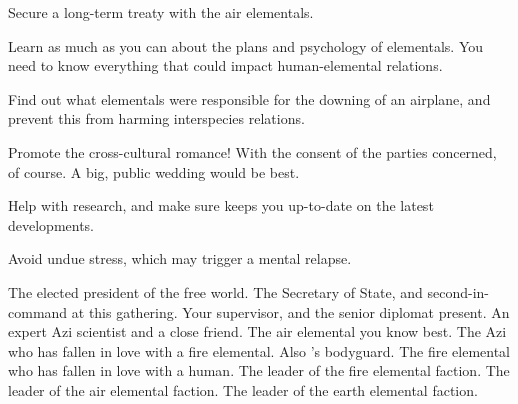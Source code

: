 \documentclass[char]{elementals}
\begin{document}
\begin{itemz}[Goals]
	\item  Secure a long-term treaty with the air elementals.
	\item  Learn as much as you can about the plans and psychology of elementals.  You need to know everything that could impact human-elemental relations.
	\item  Find out what elementals were responsible for the downing of an airplane, and prevent this from harming interspecies relations.
	\item  Promote the cross-cultural romance!  With the consent of the parties concerned, of course.  A big, public wedding would be best.
	\item  Help \cScientist{} with \cScientist{\their} research, and make sure \cScientist{\they} keeps you up-to-date on the latest developments.
	\item  Avoid undue stress, which may trigger a mental relapse.
\end{itemz}

\begin{contacts}
	\contact{\cLeader{}}  The elected president of the free world.
	\contact{\cDema{}}  The Secretary of State, and second-in-command at this gathering.
	\contact{\cAvatar{}}  Your supervisor, and the senior diplomat present.
	\contact{\cScientist{}}  An expert Azi scientist and a close friend.
	\contact{\cNaturalist{}}  The air elemental you know best. 
	\contact{\cRomeo{}}  The Azi who has fallen in love with a fire elemental.  Also \cLeader{}'s bodyguard.
	\contact{\cJuliet{}}  The fire elemental who has fallen in love with a human.
        \contact{\cQueen{}}  The leader of the fire elemental faction.
        \contact{\cKing{}}  The leader of the air elemental faction.
        \contact{\cEarthKing{}}  The leader of the earth elemental faction.
\end{contacts}
\end{document}
